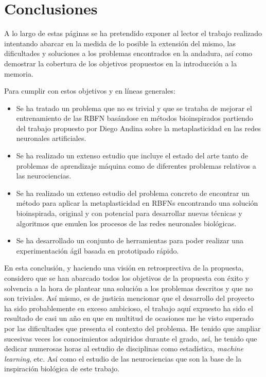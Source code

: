 \documentclass[10pt,a4paper]{report}
\begin{document}
\chapter{Conclusiones}
A lo largo de estas páginas se ha pretendido exponer al lector el trabajo realizado intentando abarcar en la medida de lo posible la extensión del mismo, las dificultades y soluciones a los problemas encontrados en la andadura, así como demostrar la cobertura de los objetivos propuestos en la introducción a la memoria.

Para cumplir con estos objetivos y en líneas generales:
\begin{itemize}
	\item Se ha tratado un problema que no es trivial y que se trataba de mejorar el entrenamiento de las RBFN basándose en métodos bioinspirados partiendo del trabajo propuesto por Diego Andina\citep{Andina2009} sobre la metaplasticidad en las redes neuronales artificiales. 
	\item Se ha realizado un extenso estudio que incluye el estado del arte tanto de problemas de aprendizaje máquina como de diferentes problemas relativos a las neurociencias. 
	\item Se ha realizado un extenso estudio del problema concreto de encontrar un método para aplicar la metaplasticidad en RBFNs encontrando una solución bioinspirada, original y con potencial para desarrollar nuevas técnicas y algoritmos que emulen los procesos de las redes neuronales biológicas.
	\item Se ha desarrollado un conjunto de herramientas para poder realizar una experimentación ágil basada en prototipado rápido.
\end{itemize}

En esta conclusión, y haciendo una visión en retrosprectiva de la propuesta, considero que se han abarcado todos los objetivos de la propuesta con éxito y solvencia a la hora de plantear una solución a los problemas descritos y que no son triviales. Así mismo, es de justicia mencionar que el desarrollo del proyecto ha sido probablemente en exceso ambicioso, el trabajo aquí expuesto ha sido el resultado de casi un año en que en multitud de ocasiones me he visto superado por las dificultades que presenta el contexto del problema. He tenido que ampliar sucesivas veces los conocimientos adquiridos durante el grado, así, he tenido que dedicar numerosas horas al estudio de disciplinas como estadística, \textit{machine learning}, etc. Así como el estudio de las neurociencias que son la base de la inspiración biológica de este trabajo.
\end{document}
